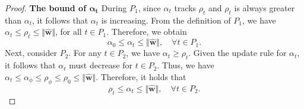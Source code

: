 \documentclass[pdflatex,sn-basic]{sn-jnl}%
\theoremstyle{thmstyleone}%
\begin{document}
\begin{appendices}
\begin{proof}
  \noindent \textbf{The bound of \( \boldsymbol{\alpha_t} \)} 
  During \( P_1 \), since \( \alpha_t \) tracks \( \rho_t \) and \( \rho_t \) is always greater than \( \alpha_t \), it follows that \( \alpha_t \) is increasing. 
  From the definition of \( P_1 \), we have \( \alpha_t \le \rho_t \le \Vert \hat{\mathbf{w}} \Vert \), for all \( t \in P_1 \). Therefore, we obtain 
  \begin{equation*}
  \alpha_0 \le \alpha_t \le \Vert \hat{\mathbf{w}} \Vert, \quad \forall t \in P_1.
  \end{equation*}
  Next, consider \( P_2 \). For any \( t \in P_2 \), we have \( \alpha_t \ge \rho_t \). 
  Given the update rule for \( \alpha_t \), it follows that \( \alpha_t \) must decrease for \( t \in P_2 \). 
  Thus, we have 
  $\alpha_t \le \alpha_{\phi} \le \rho_{\phi} \le \rho_0 \le \Vert \hat{\mathbf{w}} \Vert.$
  Therefore, it holds that 
  \begin{equation*}
  \rho_t \le \alpha_t \le \Vert \hat{\mathbf{w}} \Vert, \quad \forall t \in P_2.
  \end{equation*}


\end{proof}
\end{appendices}
\end{document}
